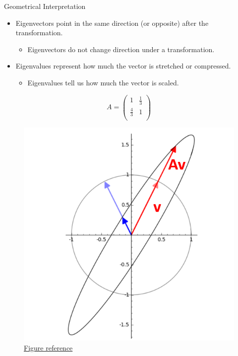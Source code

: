\documentclass[serif, aspectratio=169]{beamer}
\begin{document}
\begin{frame}{Geometrical Interpretation}
    \begin{itemize}

        \item Eigenvectors point in the same direction (or opposite) after the transformation.
        \begin{itemize}
            \item Eigenvectors do not change direction under a transformation.
        \end{itemize}
        \item Eigenvalues represent how much the vector is stretched or compressed.
        \begin{itemize}
            \item Eigenvalues tell us how much the vector is scaled.
        \end{itemize}
    \end{itemize}
    \begin{minipage}{0.4\textwidth}
         $$A = \begin{pmatrix}  
1 & \frac{1}{3}  \\
\frac{4}{3} & 1 \\
\end{pmatrix}$$
    \end{minipage}
    \begin{minipage}{0.55\textwidth}
        \begin{figure}[htpb]
            \begin{center} \includegraphics[keepaspectratio, scale=0.3]{pic/eigenvetor-eigenvalue-idea.png} \caption{\href{https://mathformachines.com/posts/eigenvalues-and-singular-values/}{Figure reference}}
            \end{center}
        \end{figure}
    \end{minipage}
\end{frame}
\end{document}
